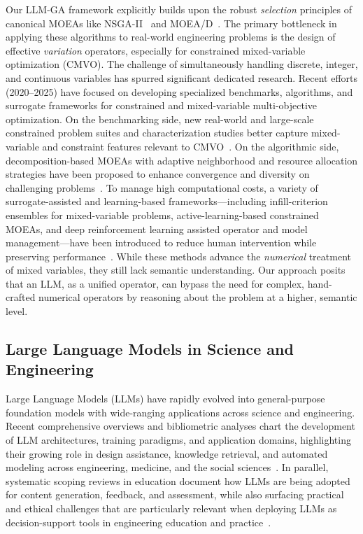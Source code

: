 \documentclass[preprint,12pt]{elsarticle}
\begin{document}
Our LLM-GA framework explicitly builds upon the robust \textit{selection} principles of canonical MOEAs like NSGA-II~\citep{Deb2002} and MOEA/D~\citep{Zhang2007}. The primary bottleneck in applying these algorithms to real-world engineering problems is the design of effective \textit{variation} operators, especially for constrained mixed-variable optimization (CMVO). The challenge of simultaneously handling discrete, integer, and continuous variables has spurred significant dedicated research.
Recent efforts (2020--2025) have focused on developing specialized benchmarks, algorithms, and surrogate frameworks for constrained and mixed-variable multi-objective optimization. On the benchmarking side, new real-world and large-scale constrained problem suites and characterization studies better capture mixed-variable and constraint features relevant to CMVO~\citep{tanabe2020suite,qiao2024lscmo,vodopija2021feature}. On the algorithmic side, decomposition-based MOEAs with adaptive neighborhood and resource allocation strategies have been proposed to enhance convergence and diversity on challenging problems~\citep{wang2020moead,Yu2024MOEAD,Jia2025DGMOEAD}. To manage high computational costs, a variety of surrogate-assisted and learning-based frameworks---including infill-criterion ensembles for mixed-variable problems, active-learning-based constrained MOEAs, and deep reinforcement learning assisted operator and model management---have been introduced to reduce human intervention while preserving performance~\citep{liu2024icemoeamv,singh2024almo,ming2024drl,shao2025drl,li2022csa,dai2025automated}. While these methods advance the \textit{numerical} treatment of mixed variables, they still lack semantic understanding. Our approach posits that an LLM, as a unified operator, can bypass the need for complex, hand-crafted numerical operators by reasoning about the problem at a higher, semantic level.

\subsection{Large Language Models in Science and Engineering}

Large Language Models (LLMs) have rapidly evolved into general-purpose foundation models with wide-ranging applications across science and engineering. Recent comprehensive overviews and bibliometric analyses chart the development of LLM architectures, training paradigms, and application domains, highlighting their growing role in design assistance, knowledge retrieval, and automated modeling across engineering, medicine, and the social sciences~\citep{naveed2023llmoverview,fan2023llmbiblio}. In parallel, systematic scoping reviews in education document how LLMs are being adopted for content generation, feedback, and assessment, while also surfacing practical and ethical challenges that are particularly relevant when deploying LLMs as decision-support tools in engineering education and practice~\citep{yan2023llmedu}.
\end{document}
